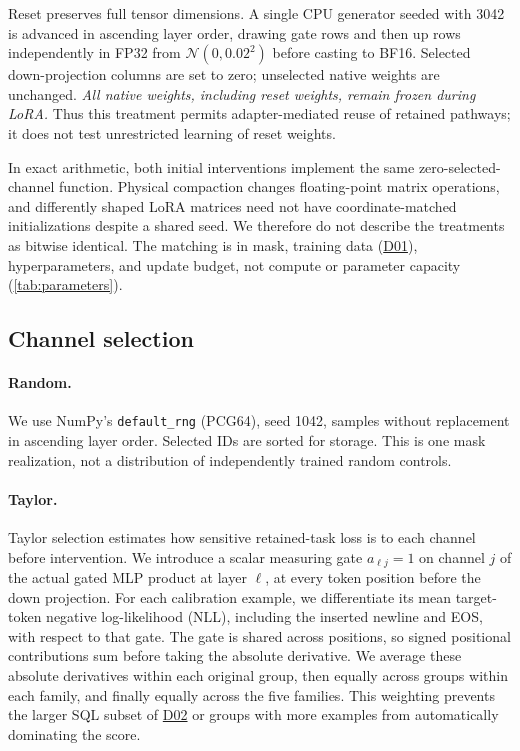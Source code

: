 \documentclass[10pt,letterpaper]{article}
\DeclareRobustCommand{\dataset}[1]{\hyperlink{dataset-#1}{\textnormal{#1}}}
\begin{document}
Reset preserves full tensor dimensions. A single CPU generator seeded with
3042 is advanced in ascending layer order, drawing gate rows and then up
rows independently in FP32 from $\mathcal{N}(0,0.02^2)$ before casting to BF16.
Selected down-projection columns are set to zero; unselected native weights
are unchanged. \emph{All native weights, including reset weights, remain
frozen during LoRA.} Thus this treatment permits adapter-mediated reuse of
retained pathways; it does not test unrestricted learning of reset weights.

In exact arithmetic, both initial interventions implement the same
zero-selected-channel function. Physical compaction changes floating-point
matrix operations, and differently shaped LoRA matrices need not have
coordinate-matched initializations despite a shared seed. We therefore do
not describe the treatments as bitwise identical. The matching is in mask,
training data (\dataset{D01}), hyperparameters, and update budget, not compute or parameter
capacity (\autoref{tab:parameters}).

\subsection{Channel selection}
\label{sec:selection}

\paragraph{Random.}
We use NumPy's \texttt{default\_rng} (PCG64), seed 1042, samples without replacement
in ascending layer order. Selected IDs are sorted for storage. This is one
mask realization, not a distribution of independently trained random controls.

\paragraph{Taylor.}
Taylor selection estimates how sensitive retained-task loss is to each
channel before intervention. We introduce a scalar measuring gate
$a_{\ell j}=1$ on channel $j$ of the actual gated MLP product at layer
$\ell$, at every token position before the down projection. For each
calibration example, we differentiate its mean target-token negative
log-likelihood (NLL), including the inserted newline and EOS, with respect
to that gate. The gate is shared across positions, so signed positional
contributions sum before taking the absolute derivative. We average these
absolute derivatives within each original group, then equally across groups
within each family, and finally equally across the five families. This
weighting prevents the larger SQL subset of \dataset{D02} or groups with more examples from
automatically dominating the score.
\end{document}
